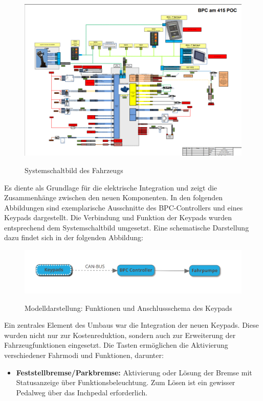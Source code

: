 \documentclass[a4paper, 12pt]{article} %
\begin{document}
\begin{spacing}{1.5}
\begin{figure}[H]
    \includegraphics[width=0.9\linewidth]{images/Systemschaltbild.png}\\[1ex]
    \centering
    \caption{Systemschaltbild des Fahrzeugs}    
    \label{ABBILDUNG}
\end{figure}

Es diente als Grundlage für die elektrische Integration und zeigt die Zusammenhänge zwischen den neuen Komponenten. In den folgenden Abbildungen sind exemplarische Ausschnitte des BPC-Controllers und eines Keypads dargestellt. Die Verbindung und Funktion der Keypads wurden entsprechend dem Systemschaltbild umgesetzt. Eine schematische Darstellung dazu findet sich in der  folgenden Abbildung:

\begin{figure}[H]
    \includegraphics[width=1\linewidth]{images/Keypads Mindmap.png}\\[1ex]
    \centering
    \caption{Modelldarstellung: Funktionen und Anschlussschema des Keypads}
    \label{ABBILDUNG}
\end{figure}

Ein zentrales Element des Umbaus war die Integration der neuen Keypads. Diese wurden nicht nur zur Kostenreduktion, sondern auch zur Erweiterung der Fahrzeugfunktionen eingesetzt. Die Tasten ermöglichen die Aktivierung verschiedener Fahrmodi und Funktionen, darunter:

\begin{itemize}
    \item \textbf{Feststellbremse/Parkbremse:} Aktivierung oder Lösung der Bremse mit Statusanzeige über Funktionsbeleuchtung. Zum Lösen ist ein gewisser Pedalweg über das Inchpedal erforderlich.
    

\end{itemize}
\end{spacing}
\end{document}
